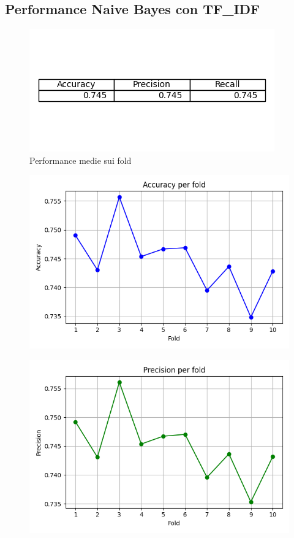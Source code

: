 \documentclass[12pt,a4paper]{report} %
\begin{document}
\subsection{Performance Naive Bayes con TF\_IDF}
\begin{figure}[H]
    \centering
    \includegraphics[width=0.75\linewidth]{immagini_modeling/nb_tfidf.png}
    \caption{Performance medie sui fold}
    \label{fig:enter-label}
\end{figure}
\begin{figure}[H]
    \centering
    \includegraphics[width=0.75\linewidth]{immagini_modeling/accuracy_nb_tfidf.png}
    \label{fig:enter-label}
\end{figure}
\begin{figure}[H]
    \centering
    \includegraphics[width=0.75\linewidth]{immagini_modeling/precision_nb_tfidf.png}
    \label{fig:enter-label}
\end{figure}
\end{document}
